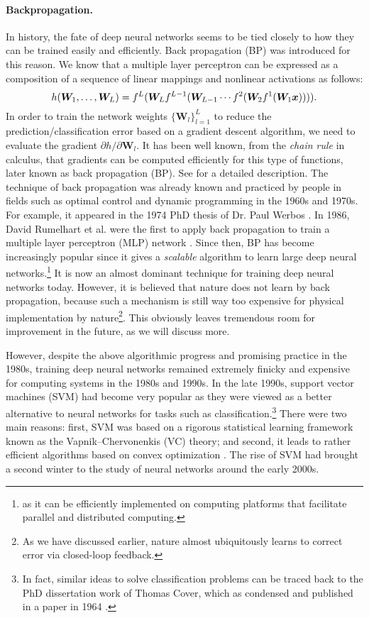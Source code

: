 \documentclass[../../book-main.tex]{subfiles}
\begin{document}
\paragraph{Backpropagation.}
In history, the fate of deep neural networks seems to be tied closely to how they can be trained easily and efficiently. Back propagation (BP) was introduced for this reason. We know that a multiple layer perceptron can be expressed as a  composition of a sequence of linear mappings and nonlinear activations as follows:
\begin{equation}
h(\bm W_1, \ldots, \bm W_L) = f^L(\bm W_Lf^{L-1}(\bm W_{L-1} \cdots f^2(\bm W_2f^1(\bm W_1\bm{x})))).
\end{equation}
In order to train the network weights $\{\bm W_l\}_{l=1}^L$ to reduce the prediction/classification error based on a gradient descent algorithm, we need to evaluate the gradient ${\partial h}/{\partial \bm W_l}$. It has been well known, from the {\em chain rule} in calculus, that gradients can be computed efficiently for this type of functions, later known as back propagation (BP). See  for a detailed description. The technique of back propagation was already known and practiced by people in fields such as optimal control and dynamic programming in the 1960s and 1970s. For example, it appeared in the 1974 PhD thesis of Dr. Paul Werbos \cite{Werbos-1974, Werbos1994TheRO}. In 1986, David Rumelhart et al. were the first to apply back propagation  to train a multiple layer perceptron (MLP) network \cite{Rumelhart1986}. Since then,  BP has become increasingly popular since it gives a {\em scalable} algorithm to learn large deep neural networks.\footnote{as it can be efficiently implemented on computing platforms that facilitate parallel and distributed computing.} It is now an almost dominant technique for training deep neural networks today. However, it is believed that nature does not learn by back propagation,  because such a mechanism is still way too expensive for physical implementation by nature\footnote{As we have discussed earlier, nature almost ubiquitously learns to correct error via closed-loop feedback.}. This obviously leaves tremendous room for improvement in the future, as we will discuss more.

However, despite the above algorithmic progress and promising practice in the 1980s, training deep neural networks remained extremely finicky and expensive for computing systems in the 1980s and 1990s. In the late 1990s, support vector machines (SVM) \cite{SVM-1995} had become very popular as they were viewed as a better alternative to neural networks for tasks such as classification.\footnote{In fact, similar ideas to solve classification problems can be traced back to the PhD dissertation work of Thomas Cover, which as condensed and published in a paper in 1964  \cite{Cover-1964}.} There were two main reasons: first, SVM was based on a rigorous statistical learning framework known as the Vapnik--Chervonenkis (VC) theory; and second, it leads to rather efficient algorithms based on convex optimization \cite{BoydVa04}. The rise of SVM had brought a second winter to the study of neural networks around the early 2000s. 
\end{document}
